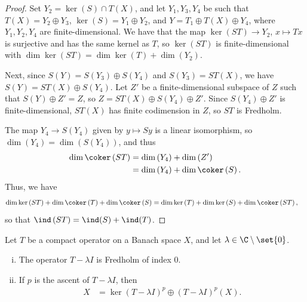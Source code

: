\documentclass[10pt]{mypackage}
\begin{document}
\begin{proof}
  Set $Y_2 = \ker(S)\cap T(X)$, and let $Y_1,Y_3,Y_4$ be such that $T(X) = Y_2\oplus Y_3$, $\ker(S) = Y_1 \oplus Y_2$, and $Y = T_1\oplus T(X)\oplus Y_4$, where $Y_1,Y_2,Y_4$ are finite-dimensional. We have that the map $\ker\left( ST \right)\rightarrow Y_2$, $x\mapsto Tx$ is surjective and has the same kernel as $T$, so $\ker\left( ST \right)$ is finite-dimensional with $\dim\ker(ST) = \dim\ker(T) + \dim\left(Y_2\right)$.

  Next, since $S(Y) = S\left( Y_3 \right)\oplus S\left( Y_4 \right)$ and $S\left( Y_3 \right) = ST(X)$, we have $S(Y) = ST(X)\oplus S\left(Y_4\right)$. Let $Z'$ be a finite-dimensional subspace of $Z$ such that $S(Y)\oplus Z' = Z$, so $Z = ST(X)\oplus S\left( Y_4 \right)\oplus Z'$. Since $S\left( Y_4 \right)\oplus Z'$ is finite-dimensional, $ST(X)$ has finite codimension in $Z$, so $ST$ is Fredholm.

  The map $Y_4\rightarrow S\left(Y_4\right)$ given by $y\mapsto Sy$ is a linear isomorphism, so $\dim\left( Y_4 \right) = \dim\left( S\left( Y_4 \right) \right)$, and thus 
  \begin{align*}
    \dim\coker\left( ST \right) &= \dim\left( Y_4 \right) + \dim\left( Z' \right)\\
                                &= \dim\left( Y_4 \right) + \dim\coker\left( S \right).
  \end{align*}
  Thus, we have
  \begin{align*}
    \dim\ker\left( ST \right) + \dim\coker\left( T \right) + \dim\coker\left( S \right) &= \dim\ker\left( T \right) + \dim\ker\left( S \right) + \dim\coker\left( ST \right),
  \end{align*}
  so that $\ind\left( ST \right) = \ind(S) + \ind(T)$.
\end{proof}
\begin{theorem}
  Let $T$ be a compact operator on a Banach space $X$, and let $\lambda\in \C\setminus \set{0}$.
  \begin{enumerate}[(i)]
    \item The operator $T - \lambda I$ is Fredholm of index $0$.
    \item If $p$ is the ascent of $T-\lambda I$, then
      \begin{align*}
        X &= \ker\left( T-\lambda I \right)^{p}\oplus \left( T-\lambda I \right)^{p}(X).
      \end{align*}
  \end{enumerate}
\end{theorem}
\end{document}
